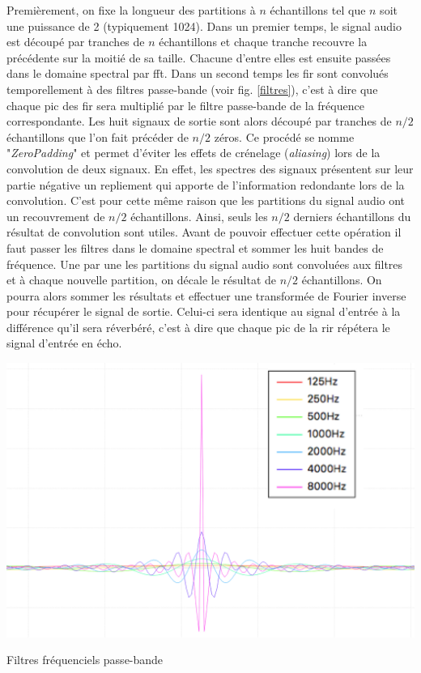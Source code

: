 Premièrement, on fixe la longueur des partitions à $n$ échantillons tel que $n$ soit une puissance de 2 (typiquement 1024). Dans un premier temps, le signal audio est découpé par tranches de $n$ échantillons et chaque tranche recouvre la précédente sur la moitié de sa taille. Chacune d'entre elles est ensuite passées dans le domaine spectral par \gls{fft}. Dans un second temps les \gls{fir} sont convolués temporellement à des filtres passe-bande (voir fig. \ref{filtres}), c'est à dire que chaque pic des \gls{fir} sera multiplié par le filtre passe-bande de la fréquence correspondante. Les huit signaux de sortie sont alors découpé par tranches de $n/2$ échantillons que l'on fait précéder de $n/2$ zéros. Ce procédé se nomme "\textit{ZeroPadding}" et permet d'éviter les effets de crénelage (\textit{aliasing}) lors de la convolution de deux signaux. En effet, les spectres des signaux présentent sur leur partie négative un repliement qui apporte de l'information redondante lors de la convolution. C'est pour cette même raison que les partitions du signal audio ont un recouvrement de $n/2$ échantillons. Ainsi, seuls les $n/2$ derniers échantillons du résultat de convolution sont utiles. Avant de pouvoir effectuer cette opération il faut passer les filtres dans le domaine spectral et sommer les huit bandes de fréquence. Une par une les partitions du signal audio sont convoluées aux filtres et à chaque nouvelle partition, on décale le résultat de $n/2$ échantillons. On pourra alors sommer les résultats et effectuer une transformée de Fourier inverse pour récupérer le signal de sortie. Celui-ci sera identique au signal d'entrée à la différence qu'il sera réverbéré, c'est à dire que chaque pic de la \gls{rir} répétera le signal d'entrée en écho.

\begin{figureth}
	\includegraphics[width=0.9\linewidth]{images/filtres}
	\caption{Filtres fréquenciels passe-bande}
	\label{filtres}
\end{figureth}


